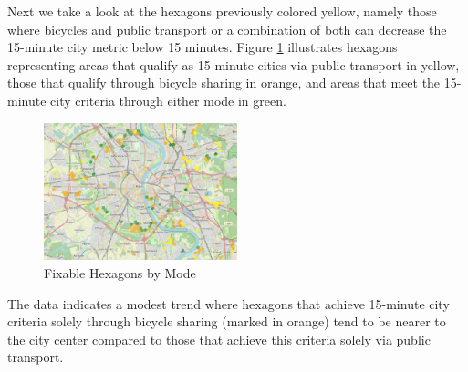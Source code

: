Next we take a look at the hexagons previously colored yellow, namely those where bicycles and public transport or a combination of both can decrease the 15-minute city metric below 15 minutes.
Figure \ref{fig:fixable_hexagons} illustrates hexagons representing areas that qualify as 15-minute cities via public transport in yellow, those that qualify through bicycle sharing in orange, and areas that meet the 15-minute city criteria through either mode in green.
\begin{figure}
  \begin{center}
    \includegraphics[width=0.50\textwidth]{Figures/results/problematic_hexagons/fixable_hexagons}
  \end{center}
  \caption{Fixable Hexagons by Mode}
  \label{fig:fixable_hexagons}
\end{figure}
The data indicates a modest trend where hexagons that achieve 15-minute city criteria solely through bicycle sharing (marked in orange) tend to be nearer to the city center compared to those that achieve this criteria solely via public transport.

